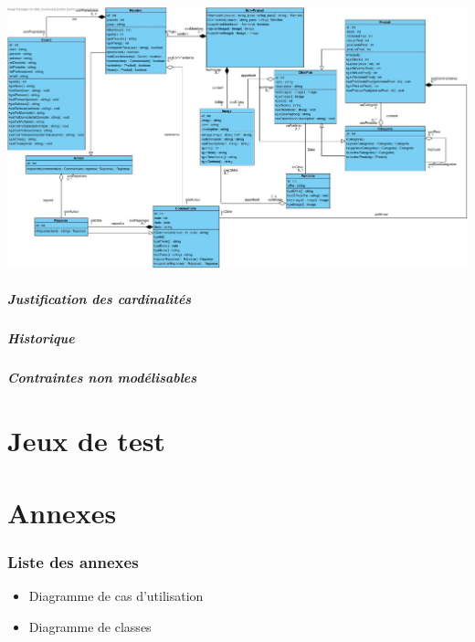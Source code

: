 \documentclass[10pt,a4paper]{article}
\begin{document}
					\includegraphics[scale=0.2]{donnees/classes.jpg}
				\subsubsection{Justification des cardinalités}
					
				\subsubsection{Historique}
					
				\subsubsection{Contraintes non modélisables}
					
	\newpage
	\part{Jeux de test}
	\newpage
	\part{Annexes}
		\section{Liste des annexes}
		\begin{itemize}
			\item Diagramme de cas d'utilisation
			\item Diagramme de classes
		\end{itemize}
\end{document}
